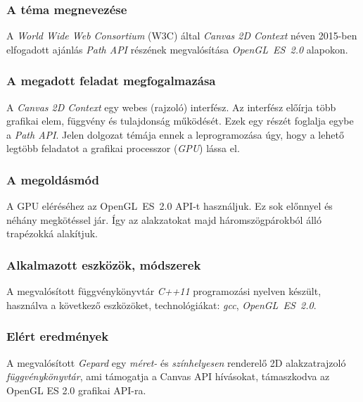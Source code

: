 \documentclass[12pt]{report}
\theoremstyle{definition}
\begin{document}

    \subsubsection*{A téma megnevezése}

A \emph{World Wide Web Consortium} (W3C) által \emph{Canvas 2D Context} néven
2015-ben elfogadott ajánlás \emph{Path API} részének megvalósítása
\emph{OpenGL~ES~2.0} alapokon.

    \subsubsection*{A megadott feladat megfogalmazása}

A \emph{Canvas 2D Context} egy webes (rajzoló) interfész. Az interfész előírja
több grafikai elem, függvény és tulajdonság működését. Ezek egy részét foglalja
egybe a \emph{Path API}. Jelen dolgozat témája ennek a leprogramozása úgy, hogy
a lehető legtöbb feladatot a grafikai processzor (\textit{GPU}) lássa el.

    \subsubsection*{A megoldásmód}

A GPU eléréséhez az OpenGL~ES~2.0 API-t használjuk. Ez sok előnnyel és néhány
megkötéssel jár. Így az alakzatokat majd háromszögpárokból álló trapézokká
alakítjuk.

    \subsubsection*{Alkalmazott eszközök, módszerek}

A megvalósított függvénykönyvtár \emph{C++11} programozási nyelven készült,
használva a következő eszközöket, technológiákat: \emph{gcc},
\textit{OpenGL~ES~2.0}.

    \subsubsection*{Elért eredmények}
A megvalósított \emph{Gepard} egy \emph{méret-} és \emph{színhelyesen}
renderelő 2D alakzatrajzoló \emph{függvénykönyvtár}, ami támogatja a Canvas API
hívásokat, támaszkodva az OpenGL ES 2.0 grafikai API-ra.
\end{document}
